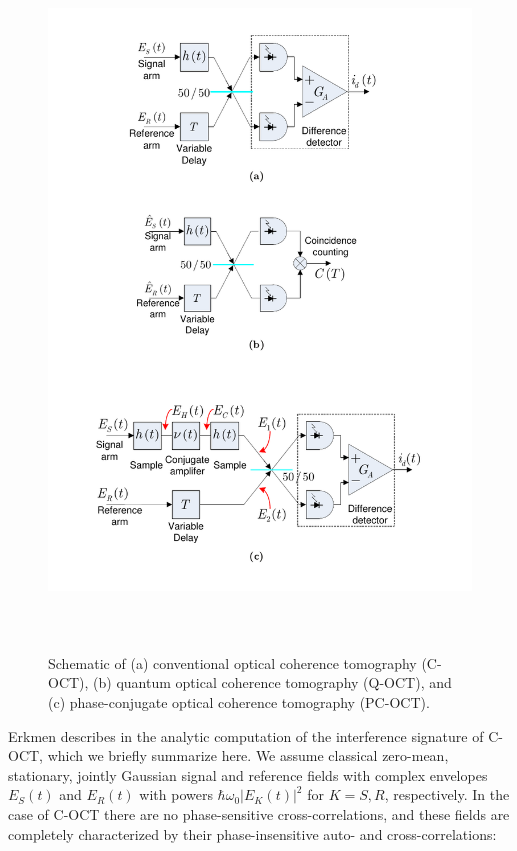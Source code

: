 \begin{figure}[h!]
\begin{center}
\includegraphics[height=18.5cm]{figure-pcoct-schematic-combined.pdf}
\caption{Schematic of (a) conventional optical coherence tomography (C-OCT), (b) quantum optical coherence tomography (Q-OCT), and (c) phase-conjugate optical coherence tomography (PC-OCT).}
\label{figure:pcoct-schematic-combined}
\end{center}
\end{figure}

Erkmen describes in \cite{erkmen-thesis} the analytic computation of the interference signature of C-OCT, which we briefly summarize here. We assume classical zero-mean, stationary, jointly Gaussian signal and reference fields with complex envelopes $E_S(t)$ and $E_R(t)$ with powers $\hbar\omega_0|E_K(t)|^2$ for $K = S, R$, respectively. In the case of C-OCT there are no phase-sensitive cross-correlations, and these fields are completely characterized by their phase-insensitive auto- and cross-correlations:

